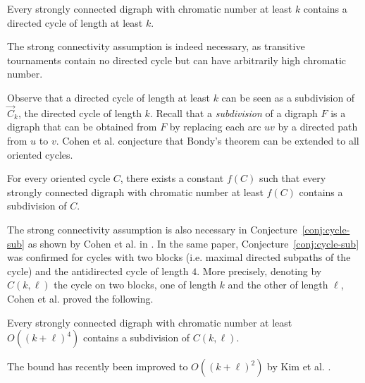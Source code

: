 \documentclass{endm}
\begin{document}
\begin{theorem}\label{thm:bondy}
Every strongly connected digraph with chromatic number at least $k$ contains a directed cycle of length at least $k$.
\end{theorem} 

The strong connectivity assumption is indeed necessary, as transitive tournaments contain no directed cycle but can have arbitrarily  high chromatic number. 

Observe that a directed cycle of length at least $k$ can be seen as a subdivision of $\vec{C}_k$, the directed cycle of length $k$.
Recall that a {\it subdivision} of a digraph $F$ is a digraph that can be obtained from $F$ by replacing each arc $uv$ by a directed path from $u$ to $v$. Cohen et al.  \cite{CHLN16} conjecture that Bondy's theorem can be extended to all oriented cycles.

\begin{conjecture}\label{conj:cycle-sub}
For every oriented cycle $C$, there exists a constant $f(C)$ such that every strongly connected digraph with chromatic number at least $f(C)$ contains a subdivision of $C$.
\end{conjecture}

The strong connectivity assumption is also necessary in Conjecture~\ref{conj:cycle-sub} as shown by Cohen et al. in  \cite{CHLN16}.
In the same paper, Conjecture~\ref{conj:cycle-sub} was confirmed for cycles with two blocks (i.e. maximal directed subpaths of the cycle) and the antidirected cycle of length $4$.
More precisely, denoting by $C(k,\ell)$ the cycle on two blocks, one of length $k$ and the other of length $\ell$,
 Cohen et al. \cite{CHLN16} proved the following.
\begin{theorem}\label{th:ckl}
Every strongly connected digraph with chromatic number at least $O((k+\ell)^4)$ contains a subdivision of $C(k,\ell)$.
\end{theorem} 
The bound has recently been improved to $O((k+\ell)^2)$  by Kim et al. \cite{KKPM}.  
\end{document}
